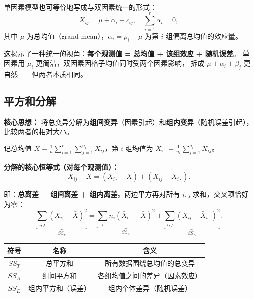 \begin{remark}[模型的另一种参数化]
单因素模型也可等价地写成与双因素统一的形式：
\begin{equation}
    X_{ij} = \mu + \alpha_i + \varepsilon_{ij}, \quad \sum_{i=1}^{r} \alpha_i = 0,
\end{equation}
其中 $\mu$ 为总均值（grand mean），$\alpha_i = \mu_i - \mu$ 为第 $i$ 组偏离总均值的效应量。

这揭示了一种统一的视角：\textbf{每个观测值 = 总均值 + 该组效应 + 随机误差}。
单因素用 $\mu_i$ 更简洁，双因素因格子均值同时受两个因素影响，
拆成 $\mu + \alpha_i + \beta_j$ 更自然——但两者本质相同。
\end{remark}

\subsection{平方和分解}

\textbf{核心思想：} 将总变异分解为\textbf{组间变异}（因素引起）和\textbf{组内变异}（随机误差引起），比较两者的相对大小。

记总均值 $\bar{X} = \frac{1}{n}\sum_{i=1}^{r}\sum_{j=1}^{n_i} X_{ij}$，第 $i$ 组均值为 $\bar{X}_{i\cdot} = \frac{1}{n_i}\sum_{j=1}^{n_i} X_{ij}$。

\textbf{分解的核心恒等式（对每个观测值）：}
\begin{equation}
    \boxed{X_{ij} - \bar{X} = (\bar{X}_{i\cdot} - \bar{X}) + (X_{ij} - \bar{X}_{i\cdot})}.
\end{equation}

即：\textbf{总离差 = 组间离差 + 组内离差}。两边平方再对所有 $i,j$ 求和，交叉项恰好为零：
\begin{equation}
    \boxed{\underbrace{\sum_{i,j}(X_{ij} - \bar{X})^2}_{SS_T}
           = \underbrace{\sum_{i} n_i(\bar{X}_{i\cdot} - \bar{X})^2}_{SS_A}
           + \underbrace{\sum_{i,j}(X_{ij} - \bar{X}_{i\cdot})^2}_{SS_E}}.
\end{equation}

\begin{center}
\begin{tabular}{c|c|c}
    \toprule
    符号 & 名称 & 含义 \\
    \midrule
    $SS_T$ & 总平方和 & 所有数据围绕总均值的总变异 \\
    $SS_A$ & 组间平方和 & 各组均值之间的差异（因素效应） \\
    $SS_E$ & 组内平方和（误差） & 组内个体差异（随机误差） \\
    \bottomrule
\end{tabular}
\end{center}

